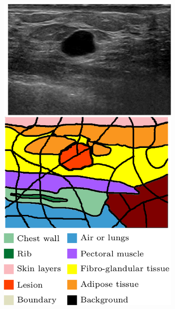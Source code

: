\begin{figure}
    \centering
    \begin{subfigure}[b]{0.19\textwidth}
        \centering
        \includegraphics[width=\textwidth]{problem}
        \label{fig:methodTerms:problem}
    \end{subfigure}
    \hfill
    \begin{subfigure}[b]{0.39\textwidth}  
        \centering 

\end{subfigure}
\end{figure}
